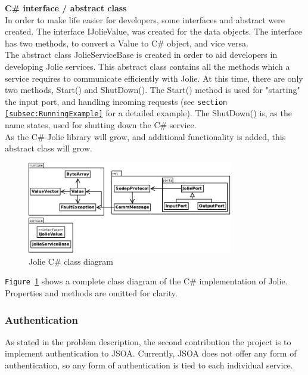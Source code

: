 \documentclass[12pt,a4paper]{article}
\begin{document}
\textbf{C\# interface / abstract class} \\
In order to make life easier for developers, some interfaces and abstract were created. The interface IJolieValue, was created for the data objects. The interface has two methods, to convert a Value to C\# object, and vice versa.\\
The abstract class JolieServiceBase is created in order to aid developers in developing Jolie services. This  abstract class contains all the methods which a service requires to communicate efficiently with Jolie. At this time, there are only two methods, Start() and ShutDown(). The Start() method is used for "starting" the input port, and handling incoming requests (see \texttt{section \ref{subsec:RunningExample}} for a detailed example). The ShutDown() is, as the name states, used for shutting down the C\# service.\\
As the C\#-Jolie library will grow, and additional functionality is added, this abstract class will grow.

\begin{figure}[h!]
  \centering
    \includegraphics[width=0.8\textwidth]{../figures/fullCSharpClassDiagram.jpeg}
  \caption{Jolie C\# class diagram}
  \label{fig:fullCSharpClassDiagram}
\end{figure}

\texttt{Figure \ref{fig:fullCSharpClassDiagram}} shows a complete class diagram of the C\# implementation of Jolie. Properties and methods are omitted for clarity.


\subsubsection{Authentication}\label{subsec:Authentication}
As stated in the problem description, the second contribution the project is to implement authentication to JSOA. Currently, JSOA does not offer any form of authentication, so any form of authentication is tied to each individual service.\\
\end{document}
